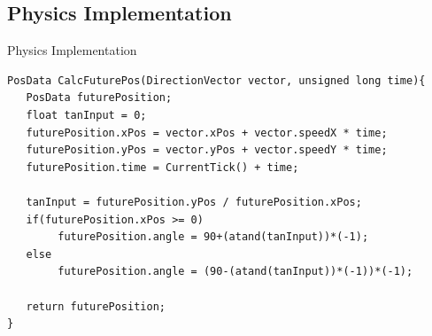 \subsection{Physics Implementation}
\begin{frame}[fragile]{Physics Implementation}
\begin{center}
\begin{minipage}[H]{0.9\linewidth}
 \begin{lstlisting}
PosData CalcFuturePos(DirectionVector vector, unsigned long time){
   PosData futurePosition;
   float tanInput = 0;
   futurePosition.xPos = vector.xPos + vector.speedX * time;
   futurePosition.yPos = vector.yPos + vector.speedY * time;
   futurePosition.time = CurrentTick() + time;

   tanInput = futurePosition.yPos / futurePosition.xPos;
   if(futurePosition.xPos >= 0)
        futurePosition.angle = 90+(atand(tanInput))*(-1);
   else
        futurePosition.angle = (90-(atand(tanInput))*(-1))*(-1);
   
   return futurePosition;
}
 \end{lstlisting} 
\end{minipage}
\end{center}
\end{frame}